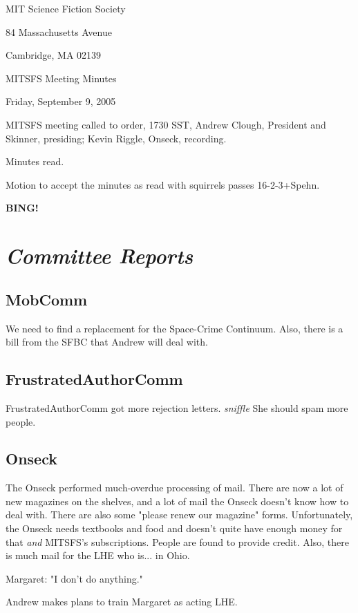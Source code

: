 \documentclass[10pt]{article}
\newcommand{\bing}{{\bf BING!} }
\newcommand{\goto}[1]{\bing \vskip 12pt \section*{{\em{#1}}}}
\begin{document}
\begin{center}

MIT Science Fiction Society

84 Massachusetts Avenue

Cambridge, MA 02139

\vspace{12pt}

MITSFS Meeting Minutes

Friday, September 9, 2005

\end{center}

\vspace{18pt}

\setlength{\parskip}{6pt}

\noindent
MITSFS meeting called to order, 1730 SST, Andrew Clough, President and 
Skinner, presiding; Kevin Riggle,  Onseck, recording.

Minutes read.

Motion to accept the minutes as read with squirrels passes 16-2-3+Spehn.

\goto{Committee Reports}
\subsection*{MobComm}
We need to find a replacement for the Space-Crime Continuum.  Also, there is a bill from
the SFBC that Andrew will deal with.

\subsection*{FrustratedAuthorComm}
FrustratedAuthorComm got more rejection letters.  \emph{sniffle}  She should spam more people.

\subsection*{Onseck}
The Onseck performed much-overdue processing of mail.  There are now a lot of new magazines on
the shelves, and a lot of mail the Onseck doesn't know how to deal with.  There are also some
"please renew our magazine" forms.  Unfortunately, the Onseck needs textbooks and food and 
doesn't quite have enough money for that \emph{and} MITSFS's subscriptions.  People are found to
provide credit.  Also, there is much mail for the LHE who is... in Ohio.  

Margaret: "I don't do anything."

Andrew makes plans to train Margaret as acting LHE.
\end{document}
